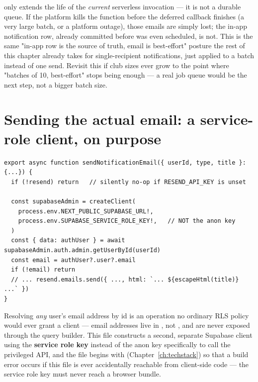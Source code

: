 \begin{olkgotcha}
 only extends the life of the \emph{current} serverless invocation — it is not a durable queue. If the platform kills the function before the deferred callback finishes (a very large batch, or a platform outage), those emails are simply lost; the in-app notification row, already committed before  was even scheduled, is not. This is the same "in-app row is the source of truth, email is best-effort" posture the rest of this chapter already takes for single-recipient notifications, just applied to a batch instead of one send. Revisit this if club sizes ever grow to the point where "batches of 10, best-effort" stops being enough — a real job queue would be the next step, not a bigger batch size.
\end{olkgotcha}

\section{Sending the actual email: a service-role client, on purpose}

\begin{lstlisting}[caption={src/lib/send-notification-email.ts — the privileged lookup}]
export async function sendNotificationEmail({ userId, type, title }: {...}) {
  if (!resend) return   // silently no-op if RESEND_API_KEY is unset

  const supabaseAdmin = createClient(
    process.env.NEXT_PUBLIC_SUPABASE_URL!,
    process.env.SUPABASE_SERVICE_ROLE_KEY!,   // NOT the anon key
  )
  const { data: authUser } = await supabaseAdmin.auth.admin.getUserById(userId)
  const email = authUser?.user?.email
  if (!email) return
  // ... resend.emails.send({ ..., html: `... ${escapeHtml(title)} ...` })
}
\end{lstlisting}

Resolving \emph{any} user's email address by id is an operation no ordinary RLS policy would ever grant a client — email addresses live in , not , and are never exposed through the query builder. This file constructs a second, separate Supabase client using the \textbf{service role key} instead of the anon key specifically to call the privileged  API, and the file begins with  (Chapter~\ref{ch:techstack}) so that a build error occurs if this file is ever accidentally reachable from client-side code — the service role key must never reach a browser bundle.

